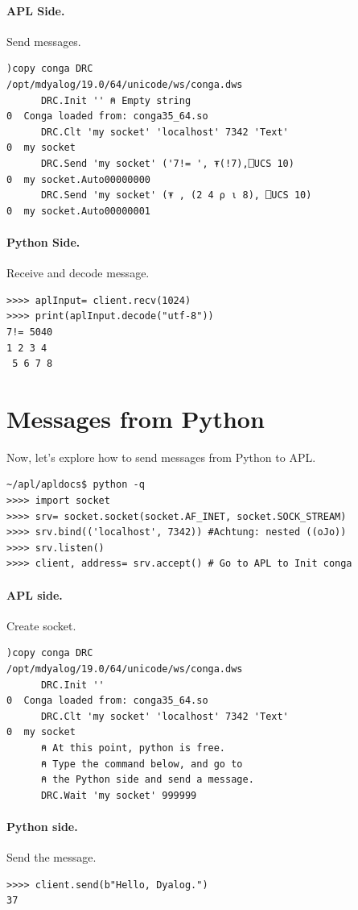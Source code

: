 \documentclass[a4paper,12pt]{book}
\begin{document}
\paragraph{APL Side.} Send messages.
\begin{lstlisting}[language=apl]
     )copy conga DRC
/opt/mdyalog/19.0/64/unicode/ws/conga.dws
      DRC.Init '' ⍝ Empty string
0  Conga loaded from: conga35_64.so
      DRC.Clt 'my socket' 'localhost' 7342 'Text'
0  my socket
      DRC.Send 'my socket' ('7!= ', ⍕(!7),⎕UCS 10)
0  my socket.Auto00000000
      DRC.Send 'my socket' (⍕ , (2 4 ⍴ ⍳ 8), ⎕UCS 10)
0  my socket.Auto00000001
\end{lstlisting}

\paragraph{Python Side.} Receive and decode message.
\begin{verbatim}
>>>> aplInput= client.recv(1024)
>>>> print(aplInput.decode("utf-8"))
7!= 5040 
1 2 3 4 
 5 6 7 8 
\end{verbatim}

\section{Messages from Python}
Now, let's explore how to send messages from Python to APL.
\begin{verbatim}
~/apl/apldocs$ python -q
>>>> import socket
>>>> srv= socket.socket(socket.AF_INET, socket.SOCK_STREAM)
>>>> srv.bind(('localhost', 7342)) #Achtung: nested ((oJo))
>>>> srv.listen()
>>>> client, address= srv.accept() # Go to APL to Init conga
\end{verbatim}

\paragraph{APL side.} Create socket.
\begin{lstlisting}[language=apl]
     )copy conga DRC
/opt/mdyalog/19.0/64/unicode/ws/conga.dws
      DRC.Init ''
0  Conga loaded from: conga35_64.so
      DRC.Clt 'my socket' 'localhost' 7342 'Text'
0  my socket
      ⍝ At this point, python is free.
      ⍝ Type the command below, and go to
      ⍝ the Python side and send a message.
      DRC.Wait 'my socket' 999999
\end{lstlisting}

\paragraph{Python side.} Send the message.
\begin{verbatim}
>>>> client.send(b"Hello, Dyalog.")
37
\end{verbatim}
\end{document}
